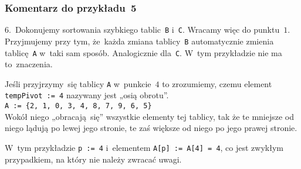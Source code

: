 \documentclass[10pt,t]{beamer}
\begin{document}
\begin{frame}
  \frametitle{Komentarz do przykładu~5}


  6.~Dokonujemy sortowania szybkiego tablic~\texttt{B} i~\texttt{C}.
  Wracamy więc do punktu~$1$. Przyjmujemy przy tym, że~każda zmiana
  tablicy~\texttt{B} automatycznie zmienia tablicę~\texttt{A} w~taki
  sam sposób. Analogicznie dla~\texttt{C}. W~tym przykładzie nie ma
  to~znaczenia.

  Jeśli przyjrzymy~się tablicy \texttt{A} w~punkcie~$4$ to zrozumiemy, czemu
  element \texttt{tempPivot := 4} nazywany jest „osią obrotu”. \\
  \texttt{A := \{2, 1, 0, 3, 4, 8, 7, 9, 6, 5\}} \\
  Wokół niego „obracają~się” wszystkie elementy tej tablicy, tak że te
  mniejsze od niego lądują po lewej jego stronie, te zaś większe od niego
  po jego prawej stronie.

  W~tym przykładzie \texttt{p := 4} i~elementem \texttt{A[p] := A[4] = 4},
  co jest zwykłym przypadkiem, na który nie należy zwracać uwagi.

\end{frame}




































\end{document}
